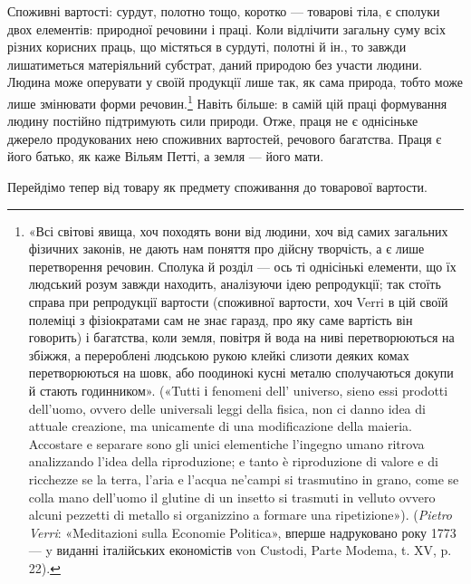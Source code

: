 Споживні вартості: сурдут, полотно тощо, коротко — товарові
тіла, є сполуки двох елементів: природної речовини і праці. Коли
відлічити загальну суму всіх різних корисних праць, що містяться
в сурдуті, полотні й ін., то завжди лишатиметься матеріяльний
субстрат, даний природою без участи людини. Людина може оперувати
у своїй продукції лише так, як сама природа, тобто може
лише змінювати форми речовин.\footnote{
«Всі світові явища, хоч походять вони від людини, хоч від самих
загальних фізичних законів, не дають нам поняття про дійсну творчість,
а є лише перетворення речовин. Сполука й розділ — ось ті однісінькі
елементи, що їх людський розум завжди находить, аналізуючи ідею репродукції;
так стоїть справа при репродукції вартости (споживної вартости,
хоч Verri в цій своїй полеміці з фізіократами сам не знає гаразд, про яку
саме вартість він говорить) і багатства, коли земля, повітря й вода на
ниві перетворюються на збіжжя, а перероблені людською рукою клейкі
слизоти деяких комах перетворюються на шовк, або поодинокі кусні
металю сполучаються докупи й стають годинником». («Tutti і fenomeni
dell' universo, sieno essi prodotti dell’uomo, ovvero delle universali leggi
della fisica, non ci danno idea di attuale creazione, ma unicamente di una
modificazione della maieria. Accostare e separare sono gli unici elementiche
l’ingegno umano ritrova analizzando l’idea della riproduzione; e tanto
è riproduzione di valore e di ricchezze se la terra, l’aria e l’acqua ne’campi
si trasmutino in grano, come se colla mano dell'uomo il glutine di un insetto
si trasmuti in velluto ovvero alcuni pezzetti di metallo si organizzino a formare
una ripetizione»). (\emph{Pietro Verri}: «Meditazioni sulla Economie Politica»,
вперше надруковано року 1773 — y виданні італійських економістів
von Custodi, Parte Modema, t. XV, p. 22).
} Навіть більше: в самій цій праці
формування людину постійно підтримують сили природи. Отже,
праця не є однісіньке джерело продукованих нею споживних вартостей,
речового багатства. Праця є його батько, як каже Вільям
Петті, а земля — його мати.

Перейдімо тепер від товару як предмету споживання до товарової
вартости.

